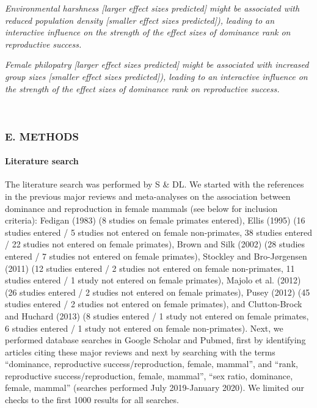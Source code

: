 \documentclass[]{article}
\let\oldparagraph\paragraph
\renewcommand{\paragraph}[1]{\oldparagraph{#1}\mbox{}}
\begin{document}
\emph{Environmental harshness {[}larger effect sizes predicted{]} might
be associated with reduced population density {[}smaller effect sizes
predicted{]}), leading to an interactive influence on the strength of
the effect sizes of dominance rank on reproductive success.}

\emph{Female philopatry {[}larger effect sizes predicted{]} might be
associated with increased group sizes {[}smaller effect sizes
predicted{]}), leading to an interactive influence on the strength of
the effect sizes of dominance rank on reproductive success.}

~

\hypertarget{e.-methods}{%
\subsubsection{E. METHODS}\label{e.-methods}}

\hypertarget{literature-search}{%
\paragraph{\texorpdfstring{\textbf{Literature
search}}{Literature search}}\label{literature-search}}

The literature search was performed by S \& DL. We started with the
references in the previous major reviews and meta-analyses on the
association between dominance and reproduction in female mammals (see
below for inclusion criteria): Fedigan (1983) (8 studies on female
primates entered), Ellis (1995) (16 studies entered / 5 studies not
entered on female non-primates, 38 studies entered / 22 studies not
entered on female primates), Brown and Silk (2002) (28 studies entered /
7 studies not entered on female primates), Stockley and Bro-Jørgensen
(2011) (12 studies entered / 2 studies not entered on female
non-primates, 11 studies entered / 1 study not entered on female
primates), Majolo et al. (2012) (26 studies entered / 2 studies not
entered on female primates), Pusey (2012) (45 studies entered / 2
studies not entered on female primates), and Clutton-Brock and Huchard
(2013) (8 studies entered / 1 study not entered on female primates, 6
studies entered / 1 study not entered on female non-primates). Next, we
performed database searches in Google Scholar and Pubmed, first by
identifying articles citing these major reviews and next by searching
with the terms ``dominance, reproductive success/reproduction, female,
mammal'', and ``rank, reproductive success/reproduction, female,
mammal'', ``sex ratio, dominance, female, mammal'' (searches performed
July 2019-January 2020). We limited our checks to the first 1000 results
for all searches.
\end{document}
